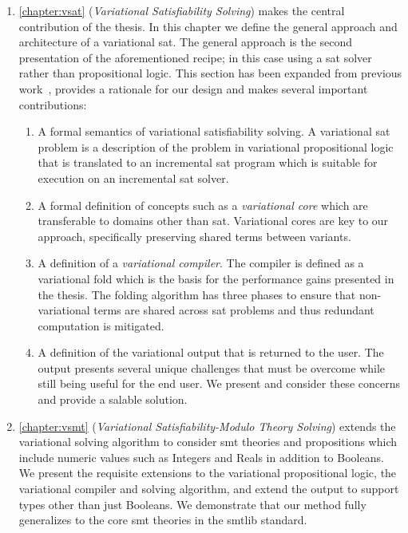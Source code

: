 \begin{enumerate}
  \item \autoref{chapter:vsat} (\emph{Variational Satisfiability Solving}) makes
    the central contribution of the thesis. In this chapter we define the
    general approach and architecture of a variational \acl{sat}. The general
    approach is the second presentation of the aforementioned recipe; in this
    case using a \ac{sat} solver rather than propositional logic. This section
    has been expanded from previous work~\cite{YWT:SPLC20}, provides a rationale
    for our design and makes several important contributions:
    \begin{enumerate}
    \item A formal semantics of variational satisfiability solving. A
      variational \ac{sat} problem is a description of the problem in
      variational propositional logic that is translated to an incremental
      \ac{sat} program which is suitable for execution on an incremental
      \ac{sat} solver.
    \item A formal definition of concepts such as a \emph{variational core}
      which are transferable to domains other than \ac{sat}. Variational cores
      are key to our approach, specifically preserving shared terms between
      variants.
    \item A definition of a \emph{variational compiler}. The compiler is defined
      as a variational fold which is the basis for the performance gains
      presented in the thesis. The folding algorithm has three phases to ensure
      that non-variational terms are shared across \ac{sat} problems and thus
      redundant computation is mitigated.
    \item A definition of the variational output that is returned to the user.
      The output presents several unique challenges that must be overcome while
      still being useful for the end user. We present and consider these
      concerns and provide a salable solution.
    \end{enumerate}

  \item \autoref{chapter:vsmt} (\emph{Variational Satisfiability-Modulo Theory
      Solving}) extends the variational solving algorithm to consider \ac{smt}
    theories and propositions which include numeric values such as Integers and
    Reals in addition to Booleans. We present the requisite extensions to the
    variational propositional logic, the variational compiler and solving
    algorithm, and extend the output to support types other than just Booleans.
    We demonstrate that our method fully generalizes to the core \ac{smt}
    theories in the \acl{smtlib} standard.


\end{enumerate}
